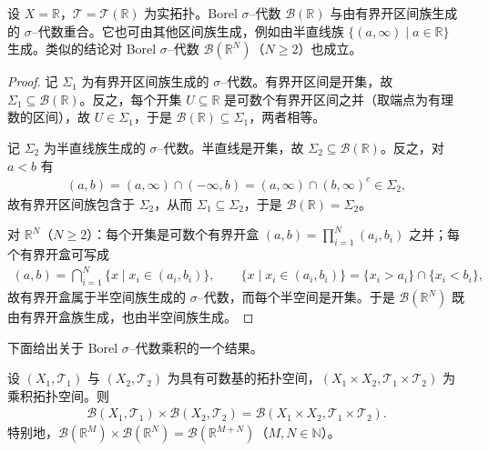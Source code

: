 \documentclass[../../main.tex]{subfiles}%
\begin{document}
\begin{remark}\label{remark:ch01-实直线Borel}
设 $X=\mathbb{R}$，$\mathcal{T}=\mathcal{T}(\mathbb{R})$ 为实拓扑。Borel $\sigma$--代数 $\mathcal{B}(\mathbb{R})$ 与由有界开区间族生成的 $\sigma$--代数重合。它也可由其他区间族生成，例如由半直线族 $\{(a,\infty)\mid a\in\mathbb{R}\}$ 生成。类似的结论对 Borel $\sigma$--代数 $\mathcal{B}(\mathbb{R}^N)$（$N\geqslant2$）也成立。
\end{remark}

\begin{proof}
记 $\Sigma_1$ 为有界开区间族生成的 $\sigma$--代数。有界开区间是开集，故 $\Sigma_1\subseteq\mathcal{B}(\mathbb{R})$。反之，每个开集 $U\subseteq\mathbb{R}$ 是可数个有界开区间之并（取端点为有理数的区间），故 $U\in\Sigma_1$，于是 $\mathcal{B}(\mathbb{R})\subseteq\Sigma_1$，两者相等。

记 $\Sigma_2$ 为半直线族生成的 $\sigma$--代数。半直线是开集，故 $\Sigma_2\subseteq\mathcal{B}(\mathbb{R})$。反之，对 $a<b$ 有
\begin{align*}
(a,b)=(a,\infty)\cap(-\infty,b)=(a,\infty)\cap(b,\infty)^c\in\Sigma_2,
\end{align*}
故有界开区间族包含于 $\Sigma_2$，从而 $\Sigma_1\subseteq\Sigma_2$，于是 $\mathcal{B}(\mathbb{R})=\Sigma_2$。

对 $\mathbb{R}^N$（$N\geqslant2$）：每个开集是可数个有界开盒 $(a,b)=\prod_{i=1}^N(a_i,b_i)$ 之并；每个有界开盒可写成
\begin{align*}
(a,b)=\bigcap_{i=1}^N\{x\mid x_i\in(a_i,b_i)\},\qquad
\{x\mid x_i\in(a_i,b_i)\}=\{x_i>a_i\}\cap\{x_i<b_i\},
\end{align*}
故有界开盒属于半空间族生成的 $\sigma$--代数，而每个半空间是开集。于是 $\mathcal{B}(\mathbb{R}^N)$ 既由有界开盒族生成，也由半空间族生成。
\end{proof}

下面给出关于 Borel $\sigma$--代数乘积的一个结果。

\begin{theorem}\label{theorem:ch01-Borel乘积}\label{theorem:ch01-Borel积}
设 $(X_1,\mathcal{T}_1)$ 与 $(X_2,\mathcal{T}_2)$ 为具有可数基的拓扑空间，$(X_1\times X_2,\mathcal{T}_1\times\mathcal{T}_2)$ 为乘积拓扑空间。则
\begin{align*}
\mathcal{B}(X_1,\mathcal{T}_1)\times\mathcal{B}(X_2,\mathcal{T}_2)=\mathcal{B}(X_1\times X_2,\mathcal{T}_1\times\mathcal{T}_2).
\end{align*}
特别地，$\mathcal{B}(\mathbb{R}^M)\times\mathcal{B}(\mathbb{R}^N)=\mathcal{B}(\mathbb{R}^{M+N})$（$M,N\in\mathbb{N}$）。
\end{theorem}
\end{document}
